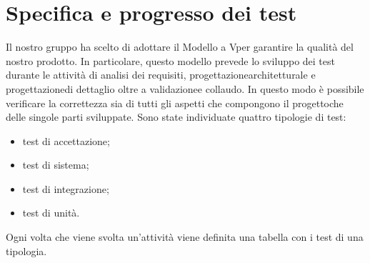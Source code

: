 \section{Specifica e progresso dei test}
Il nostro gruppo ha scelto di adottare il Modello a V\glosp per garantire la qualità del nostro prodotto\glo. In particolare, questo modello prevede lo sviluppo dei test durante le attività di analisi dei requisiti, progettazione\glosp architetturale e progettazione\glosp di dettaglio oltre a validazione\glosp e collaudo.
In questo modo è possibile verificare la correttezza sia di tutti gli aspetti che compongono il progetto\glosp che delle singole parti sviluppate. Sono state individuate quattro tipologie di test:
\begin{itemize}
	\item test di accettazione;
	\item test di sistema;
	\item test di integrazione;
	\item test di unità.
\end{itemize}
Ogni volta che viene svolta un'attività viene definita una tabella con i test di una tipologia.

